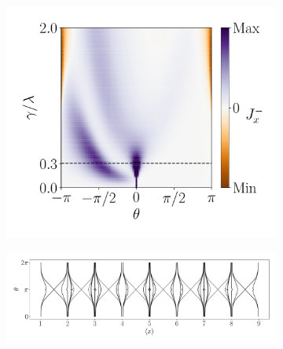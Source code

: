 \begin{figure}[h!]
\begin{minipage}[h!]{1\textwidth}
\begin{subfigure}[b!]{0.35 \textwidth}
         \end{subfigure}\hspace*{-0.5em}
         \begin{subfigure}[b!]{0.35 \textwidth}
             \caption{}
             \includegraphics[width=\textwidth]{Imagenes/Resultados_pump_Fractal/xy/current_square_pump_neg.pdf}
         \end{subfigure}\hspace*{-0.5em}
     \end{minipage}\vspace*{-1em}
     
     
     \begin{minipage}[h!]{1\textwidth}
         \begin{subfigure}[b!]{1.0\textwidth}
             \caption{}
             \includegraphics[width=\textwidth]{Imagenes/Resultados_pump_Fractal/xy/wannier_centerx.pdf}
         \end{subfigure}\hspace*{-0.5em}
     \end{minipage}\vspace*{-1em}


\end{figure}
